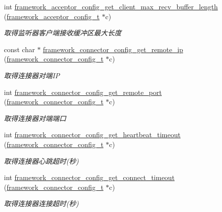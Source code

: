 \begin{DoxyCompactItemize}
int \hyperlink{a00056_a57338d58973436dba20f7e264784302d_a57338d58973436dba20f7e264784302d}{framework\+\_\+acceptor\+\_\+config\+\_\+get\+\_\+client\+\_\+max\+\_\+recv\+\_\+buffer\+\_\+length} (\hyperlink{a00051_a61a4e424ff4c86631423dedd97c40064_a61a4e424ff4c86631423dedd97c40064}{framework\+\_\+acceptor\+\_\+config\+\_\+t} $\ast$c)
\begin{DoxyCompactList}\small\item\em 取得监听器客户端接收缓冲区最大长度 \end{DoxyCompactList}\item 
const char $\ast$ \hyperlink{a00056_a0fbfc87ecd9e3f9eb5e2b11cb41492c0_a0fbfc87ecd9e3f9eb5e2b11cb41492c0}{framework\+\_\+connector\+\_\+config\+\_\+get\+\_\+remote\+\_\+ip} (\hyperlink{a00051_a81253f4c995b97e69be0e67f7a26097f_a81253f4c995b97e69be0e67f7a26097f}{framework\+\_\+connector\+\_\+config\+\_\+t} $\ast$c)
\begin{DoxyCompactList}\small\item\em 取得连接器对端\+I\+P \end{DoxyCompactList}\item 
int \hyperlink{a00056_a431430a477e5bd3b2f5d1cdd086d9e26_a431430a477e5bd3b2f5d1cdd086d9e26}{framework\+\_\+connector\+\_\+config\+\_\+get\+\_\+remote\+\_\+port} (\hyperlink{a00051_a81253f4c995b97e69be0e67f7a26097f_a81253f4c995b97e69be0e67f7a26097f}{framework\+\_\+connector\+\_\+config\+\_\+t} $\ast$c)
\begin{DoxyCompactList}\small\item\em 取得连接器对端端口 \end{DoxyCompactList}\item 
int \hyperlink{a00056_a09b5a84e743f5631978265baa74fc9df_a09b5a84e743f5631978265baa74fc9df}{framework\+\_\+connector\+\_\+config\+\_\+get\+\_\+heartbeat\+\_\+timeout} (\hyperlink{a00051_a81253f4c995b97e69be0e67f7a26097f_a81253f4c995b97e69be0e67f7a26097f}{framework\+\_\+connector\+\_\+config\+\_\+t} $\ast$c)
\begin{DoxyCompactList}\small\item\em 取得连接器心跳超时(秒) \end{DoxyCompactList}\item 
int \hyperlink{a00056_a8ae50af498b76007307c7ef858dbe345_a8ae50af498b76007307c7ef858dbe345}{framework\+\_\+connector\+\_\+config\+\_\+get\+\_\+connect\+\_\+timeout} (\hyperlink{a00051_a81253f4c995b97e69be0e67f7a26097f_a81253f4c995b97e69be0e67f7a26097f}{framework\+\_\+connector\+\_\+config\+\_\+t} $\ast$c)
\begin{DoxyCompactList}\small\item\em 取得连接器连接超时(秒) \end{DoxyCompactList}\item 

\end{DoxyCompactItemize}
